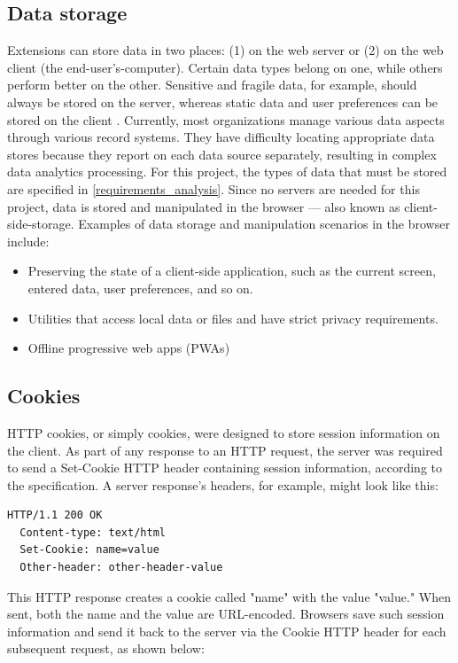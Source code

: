 \subsection{Data storage}
Extensions can store data in two places: (1) on the web server or (2) on the web client (the end-user's-computer). Certain data types belong on one, while others perform better on the other. Sensitive and fragile data, for example, should always be stored on the server, whereas static data and user preferences can be stored on the client \autocite{macdonald2013html5}. Currently, most organizations manage various data aspects through various record systems. They have difficulty locating appropriate data stores because they report on each data source separately, resulting in complex data analytics processing. For this project, the types of data that must be stored are specified in \autoref{requirements_analysis}. Since no servers are needed for this project, data is stored and manipulated in the browser --- also known as client-side-storage. Examples of data storage and manipulation scenarios in the browser include:

\begin{itemize}
  \item Preserving the state of a client-side application, such as the current screen, entered data, user preferences, and so on.
  \item Utilities that access local data or files and have strict privacy requirements.
  \item Offline progressive web apps (PWAs)
\end{itemize}

\subsection*{Cookies}
HTTP cookies, or simply cookies, were designed to store session information on the client. As part of any response to an HTTP request, the server was required to send a Set-Cookie HTTP header containing session information, according to the specification. A server response's headers, for example, might look like this:

\begin{lstlisting}[language={}, caption={Cookie server response's headers}]
  HTTP/1.1 200 OK
  Content-type: text/html
  Set-Cookie: name=value
  Other-header: other-header-value
\end{lstlisting}

This HTTP response creates a cookie called "name" with the value "value." When sent, both the name and the value are URL-encoded. Browsers save such session information and send it back to the server via the Cookie HTTP header for each subsequent request, as shown below:

